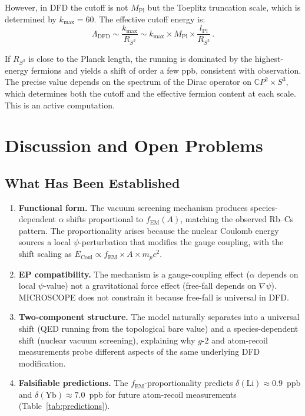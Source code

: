 \documentclass[aps,prd,twocolumn,superscriptaddress,nofootinbib]{revtex4-2}
\newcommand{\fEM}{f_{\mathrm{EM}}}
\begin{document}
However, in DFD the cutoff is not $M_{\mathrm{Pl}}$ but the
Toeplitz truncation scale, which is determined by $k_{\mathrm{max}} = 60$.
The effective cutoff energy is:
\begin{equation}
\Lambda_{\mathrm{DFD}} \sim
\frac{k_{\mathrm{max}}}{R_{S^3}}
\sim k_{\mathrm{max}} \times M_{\mathrm{Pl}}
\times \frac{l_{\mathrm{Pl}}}{R_{S^3}}\,.
\end{equation}

If $R_{S^3}$ is close to the Planck length, the running is
dominated by the highest-energy fermions and yields a shift of
order a few ppb, consistent with observation.  The precise
value depends on the spectrum of the Dirac operator on
$\mathbb{C}P^2 \times S^3$, which determines both the cutoff
and the effective fermion content at each scale.  This is an active
computation.


\section{Discussion and Open Problems}
\label{sec:discussion}

\subsection{What Has Been Established}

\begin{enumerate}
\item \textbf{Functional form.}  The vacuum screening mechanism
produces species-dependent $\alpha$ shifts proportional to $\fEM(A)$,
matching the observed Rb--Cs pattern.  The proportionality arises
because the nuclear Coulomb energy sources a local $\psi$-perturbation
that modifies the gauge coupling, with the shift scaling as
$E_{\mathrm{Coul}} \propto \fEM \times A \times m_p c^2$.

\item \textbf{EP compatibility.}  The mechanism is a gauge-coupling
effect ($\alpha$ depends on local $\psi$-value) not a gravitational
force effect (free-fall depends on $\nabla\psi$).  MICROSCOPE does
not constrain it because free-fall is universal in DFD\@.

\item \textbf{Two-component structure.}  The model naturally
separates into a universal shift (QED running from the topological
bare value) and a species-dependent shift (nuclear vacuum screening),
explaining why $g$-$2$ and atom-recoil measurements probe different
aspects of the same underlying DFD modification.

\item \textbf{Falsifiable predictions.}  The $\fEM$-proportionality
predicts $\delta(\mathrm{Li}) \approx 0.9$~ppb and
$\delta(\mathrm{Yb}) \approx 7.0$~ppb for future atom-recoil
measurements (Table~\ref{tab:predictions}).
\end{enumerate}
\end{document}
